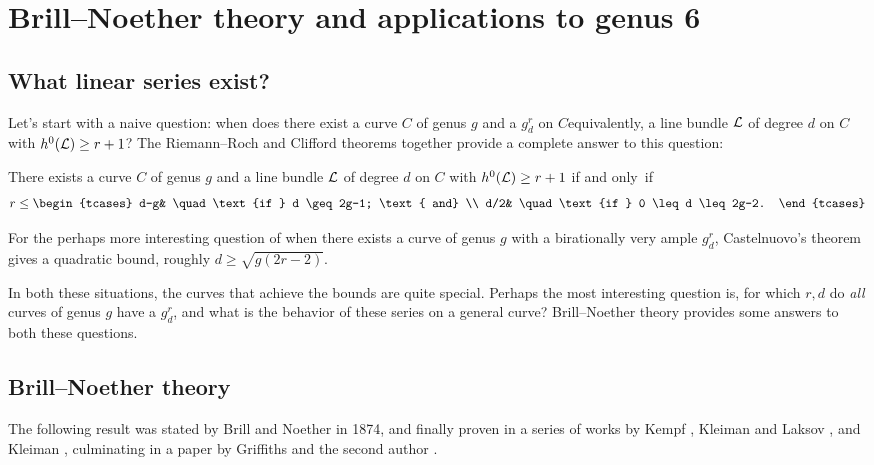 
\chapter{Brill--Noether theory and applications to genus 6}\label{Brill--Noether}\label{BNChapter}

\section{What linear series exist?}

Let's start with a naive question: when does there exist a curve $C$
of genus $g$ and a $g^r_d$ on $C$\emdash equivalently, a line bundle
${\mathcal L}$ of degree $d$ on $C$ with $h^0({\mathcal L}) \geq r+1$? The
Riemann--Roch and
%
Clifford theorems
%
together provide a complete answer to this question:

\begin{theorem}\label{arbitrary linear series}
There exists a curve $C$ of genus $g$ and a line bundle ${\mathcal L}$ of degree $d$ on $C$ with $h^0({\mathcal L}) \geq r+1$ if and only~if
$$
r \leq
\begin{tcases}
d-g& \quad \text{if } d \geq 2g-1; \text{ and} \\
d/2&  \quad \text{if } 0 \leq d \leq 2g-2.
\end{tcases}
$$
\end{theorem}


For the
perhaps more interesting question of when  there
exists a curve of genus $g$ with a
birationally very ample $g^r_d$, Castelnuovo's theorem
%
%
%
gives a quadratic bound, roughly $d \geq
\sqrt{g(2r-2)}$.

In both these situations, the curves that achieve the bounds are quite
special. Perhaps the most interesting question
is, for which $r,d$ do \emph{all} curves of genus $g$ have a $g^r_d$,
and what is the
behavior of these series on a general curve?
%
Brill--Noether theory
provides some answers to both these questions.

\section{Brill--Noether theory}

The following result was stated by Brill and Noether in 1874, and finally
%
%
%
proven in a series of works by
Kempf
\citeyear{Kempf},
Kleiman and Laksov
%
%
%
%
\citeyear{MR323792,MR0357398},
and Kleiman \citeyear{Kleiman-special},
culminating in a paper by
Griffiths and the second author \cite{Griffiths-Harris-BN}.

